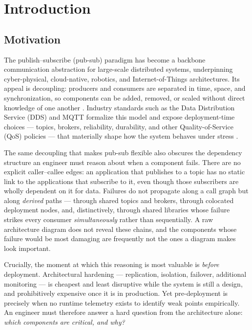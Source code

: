 \documentclass[review]{elsarticle}
\begin{document}
\section{Introduction}

\subsection{Motivation}

The publish--subscribe (pub-sub) paradigm has become a backbone communication abstraction for
large-scale distributed systems, underpinning cyber-physical, cloud-native, robotics, and
Internet-of-Things architectures. Its appeal is decoupling: producers and consumers are separated in
time, space, and synchronization, so components can be added, removed, or scaled without direct
knowledge of one another \cite{Eugster2003}. Industry standards such as the Data Distribution
Service (DDS) and MQTT formalize this model and expose deployment-time choices --- topics, brokers,
reliability, durability, and other Quality-of-Service (QoS) policies --- that materially shape how
the system behaves under stress \cite{OMG2015DDS,OASIS2019MQTT}.

The same decoupling that makes pub-sub flexible also obscures the dependency structure an engineer
must reason about when a component fails. There are no explicit caller--callee edges: an application
that publishes to a topic has no static link to the applications that subscribe to it, even though
those subscribers are wholly dependent on it for data. Failures do not propagate along a call graph
but along \emph{derived} paths --- through shared topics and brokers, through colocated deployment
nodes, and, distinctively, through shared libraries whose failure strikes every consumer
\emph{simultaneously} rather than sequentially. A raw architecture diagram does not reveal these
chains, and the components whose failure would be most damaging are frequently not the ones a
diagram makes look important.

Crucially, the moment at which this reasoning is most valuable is \emph{before} deployment.
Architectural hardening --- replication, isolation, failover, additional monitoring --- is cheapest
and least disruptive while the system is still a design, and prohibitively expensive once it is in
production. Yet pre-deployment is precisely when no runtime telemetry exists to identify weak points
empirically. An engineer must therefore answer a hard question from the architecture alone:
\emph{which components are critical, and why?}
\end{document}
